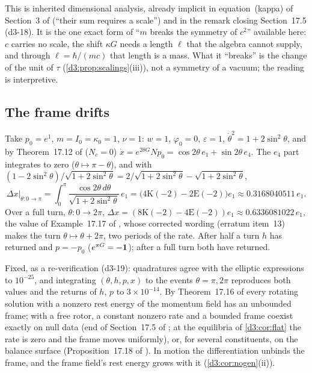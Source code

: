 This is inherited dimensional analysis, already implicit in equation~(kappa) of Section~3 of \cite{ES17} (``their sum requires a scale'') and in the
remark closing Section~17.5 (d3-18). It is the one exact form of ``$m$ breaks the symmetry of $c^2$'' available here: $c$ carries no scale, the shift
$\kappa G$ needs a length $\ell$ that the algebra cannot supply, and through $\ell=\hbar/(mc)$ that length is a mass. What it ``breaks'' is the change
of the unit of $\tau$ (\cref{d3:prop:scalings}(iii)), not a symmetry of a vacuum; the reading is interpretive.

\subsection{The frame drifts}
\label{d3:sec:drift}

\begin{example}
\label{d3:ex:drift}
Take $p_0=e^1$, $m=I_0=\kappa_0=1$, $\nu=1$: $w=1$, $\varphi_0=0$, $\varepsilon=1$, $\dot\theta^2=1+2\sin^2\theta$, and by Theorem~17.12 of \cite{ES17}
($N_c=0$) $\dot x=e^{2\theta G}Np_0=\cos2\theta\,e_1+\sin2\theta\,e_4$. The $e_4$ part integrates to zero ($\theta\mapsto\pi-\theta$), and with
$(1-2\sin^2\theta)/\sqrt{1+2\sin^2\theta}=2/\sqrt{1+2\sin^2\theta}-\sqrt{1+2\sin^2\theta}$,
\[
\Delta x\big|_{\theta:0\to\pi}=\int_0^\pi\frac{\cos2\theta\,d\theta}{\sqrt{1+2\sin^2\theta}}\,e_1=\bigl(4\mathrm K(-2)-2\mathrm E(-2)\bigr)e_1\approx0.3168040511\,e_1 .
\]
Over a full turn, $\theta:0\to2\pi$, $\Delta x=(8\mathrm K(-2)-4\mathrm E(-2))e_1\approx0.6336081022\,e_1$, the value of Example~17.17 of \cite{ES17}, whose
corrected wording (erratum item~13) makes the turn $\theta\mapsto\theta+2\pi$, two periods of the rate. After half a turn $h$ has returned and
$p=-p_0$ ($e^{\pi G}=-\mathbf 1$); after a full turn both have returned.
\end{example}

Fixed, as a re-verification (d3-19): quadratures agree with the elliptic expressions to $10^{-25}$, and integrating $(\theta,h,p,x)$ to the events
$\theta=\pi,2\pi$ reproduces both values and the returns of $h$, $p$ to $3\times10^{-14}$. By Theorem~17.16 of \cite{ES17} every rotating solution with a
nonzero rest energy of the momentum field has an unbounded frame; with a free rotor, a constant nonzero rate and a bounded frame coexist exactly on null
data (end of Section~17.5 of \cite{ES17}; at the equilibria of \cref{d3:cor:flat} the rate is zero and the frame moves uniformly), or, for several
constituents, on the balance surface (Proposition~17.18 of \cite{ES17}). In motion the differentiation unbinds the frame, and the frame field's rest
energy grows with it (\cref{d3:cor:nogen}(ii)).

